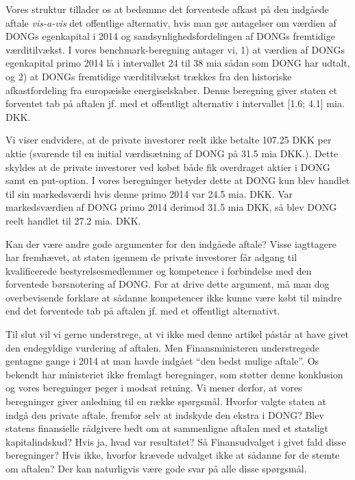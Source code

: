 \documentclass{article}
\begin{document}
Vores struktur tillader os at bedømme det forventede afkast på den indgåede aftale \emph{vis-a-vis} det offentlige alternativ, hvis man gør antagelser om værdien af DONGs egenkapital i 2014 og sandsynlighedsfordelingen af DONGs fremtidige værditilvækst. I vores benchmark-beregning antager vi, 1) at værdien af DONGs egenkapital primo 2014 lå i intervallet 24 til 38 mia sådan som DONG har udtalt, og 2) at DONGs fremtidige værditilvækst trækkes fra den historiske afkastfordeling fra europæiske energiselskaber. Denne beregning giver staten et forventet tab på aftalen jf. med et offentligt alternativ i intervallet [1.6; 4.1] mia. DKK. 

Vi viser endvidere, at de private investorer reelt ikke betalte 107.25 DKK per aktie (svarende til en initial værdisætning af DONG på 31.5 mia DKK.). Dette skyldes at de private investorer ved købet både fik overdraget  aktier i DONG samt en put-option. I vores beregninger betyder dette at DONG kun blev handlet til sin markedsværdi hvis denne primo 2014 var 24.5 mia. DKK. Var markedsværdien af DONG primo 2014 derimod 31.5 mia DKK, så blev DONG reelt handlet til 27.2 mia. DKK. 


Kan der være andre gode argumenter for den indgåede aftale? Visse iagttagere har fremhævet, at staten igennem de private investorer får adgang til kvalificerede bestyrelsesmedlemmer og kompetence i forbindelse med den forventede børsnotering af DONG. For at drive dette argument, må man dog overbevisende forklare at sådanne kompetencer ikke kunne være købt til mindre end  det forventede tab på aftalen jf. med et offentligt alternativt. %

Til slut vil vi gerne understrege, at vi ikke med denne artikel påstår at have givet den endegyldige vurdering af aftalen. Men Finansministeren understregede gentagne gange i 2014 at man havde indgået \enquote{den bedst mulige aftale}. 
Os bekendt har ministeriet ikke fremlagt beregninger, som støtter denne konklusion og vores beregninger peger i modsat retning. Vi mener derfor, at vores beregninger giver anledning til en række spørgsmål. Hvorfor valgte staten at indgå den private aftale, fremfor selv at indskyde den ekstra i DONG? Blev statens finansielle rådgivere bedt om at sammenligne aftalen med et statsligt kapitalindskud? Hvis ja, hvad var resultatet? Så Finansudvalget i givet fald disse beregninger? Hvis ikke, hvorfor krævede udvalget ikke at sådanne før de stemte om aftalen? Der kan naturligvis være gode svar på alle disse spørgsmål. %
\end{document}
